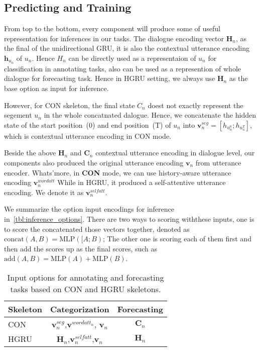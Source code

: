 
\subsection{Predicting and Training}
\label{ssec:inference_and_training}

From top to the bottom, every component will
produce some of useful representation for inferences in our tasks.
The dialogue encoding vector $\bm{H}_{n}$, as the final of the
unidirectional GRU, it is also the contextual utterance encoding
$\bm{h}_{u_{n}}$ of $u_{n}$. Hence $H_{n}$ can be directly used as a
representaion of $u_{n}$ for classification in annotating tasks, also
can be used as a represention of whole dialogue for forecasting
task. Hence in HGRU setting, we always use $\bm{H}_{n}$ as the base
option as input for inference.

However, for CON skeleton, the final state $C_{n}$ doest not exactly
represent the segement $u_{n}$ in the whole concatnated
dalogue. Hence, we concatenate the hidden state of the start
position~(0) and end position~(T) of $u_{n}$ into
$\bm{v}^{seg}_{n}=[h_{u^{0}_{n}};h_{u^{T}_{n}}]$, which is contextual
utterance encoding in CON mode.

Beside the above $\bm{H}_{n}$ and $\bm{C}_{n}$ contextual utterance
encoding in dialogue level, our components also produced the original
utterance encoding $\bm{v}_{n}$ from utterance encoder.  Whats'more,
in \textbf{CON} mode, we can use history-aware utterance encoding $\bm{v}^{wordatt}_{n}$
While in HGRU, it produced a self-attentive utterance encoding. We
denote it as $\bm{v}^{selfatt}_{n}$.

We summarize the option input encodings for inference
in~\autoref{tbl:inference_options}. There are two ways to scoring withthese
inputs, one is to score the concatenated those vectors together,
denoted as $\text{concat}(A, B)=\text{MLP}([A;B)$; The other one is
scoring each of them first and then add the scores up as the final
scores, such as $\text{add}(A,B)=\text{MLP}(A)+\text{MLP}(B)$.


\begin{table}[t]
\caption{\label{tbl:inference_options} Input options for annotating and forecasting tasks based on CON and HGRU skeletons.}
\begin{center}
\setlength{\tabcolsep}{3pt}
\begin{tabular}{lcc}
\toprule
Skeleton & Categorization & Forecasting  \\ \hline \hline
CON      & $\bm{v}^{seg}_{n}$,$\bm{v}^{{wordatt}_{n}}$, $\bm{v}_{n}$ & $\bm{C}_{n}$ \\ \hline
HGRU     & $\bm{H}_{n}$,$\bm{v}^{selfatt}_{n}$,$\bm{v}_{n}$          & $\bm{H}_{n}$ \\ \bottomrule
\end{tabular}
\end{center}
\end{table}


